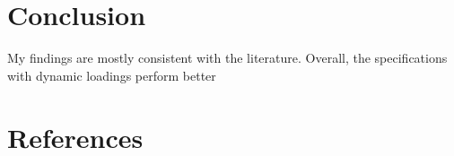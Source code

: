 \documentclass[
  12pt,
  a4paper,
  openany]{scrbook}
\begin{document}

\chapter{Conclusion}\label{conclusion}

My findings are mostly consistent with the literature. Overall, the
specifications with dynamic loadings perform better


\chapter*{References}\label{references}

\end{document}
